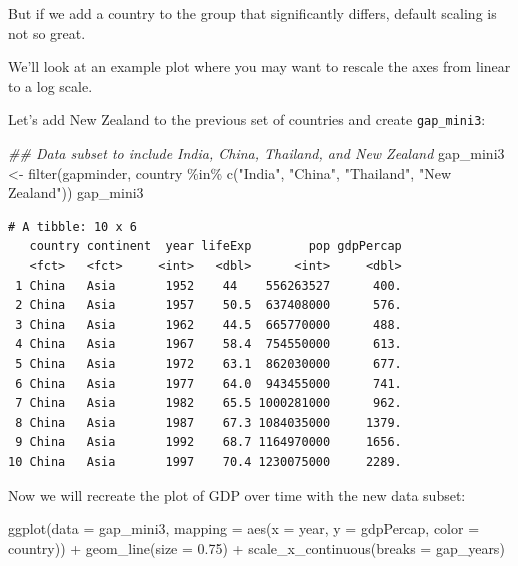 \documentclass[
  letterpaper,
  DIV=11,
  numbers=noendperiod]{scrreprt}
\newenvironment{Shaded}{\begin{snugshade}}{\end{snugshade}}
\newcommand{\AttributeTok}[1]{\textcolor[rgb]{0.40,0.45,0.13}{#1}}
\newcommand{\DocumentationTok}[1]{\textcolor[rgb]{0.37,0.37,0.37}{\textit{#1}}}
\newcommand{\FloatTok}[1]{\textcolor[rgb]{0.68,0.00,0.00}{#1}}
\newcommand{\FunctionTok}[1]{\textcolor[rgb]{0.28,0.35,0.67}{#1}}
\newcommand{\NormalTok}[1]{\textcolor[rgb]{0.00,0.23,0.31}{#1}}
\newcommand{\OtherTok}[1]{\textcolor[rgb]{0.00,0.23,0.31}{#1}}
\newcommand{\SpecialCharTok}[1]{\textcolor[rgb]{0.37,0.37,0.37}{#1}}
\newcommand{\StringTok}[1]{\textcolor[rgb]{0.13,0.47,0.30}{#1}}
\begin{document}
But if we add a country to the group that significantly differs, default
scaling is not so great.

We'll look at an example plot where you may want to rescale the axes
from linear to a log scale.

Let's add New Zealand to the previous set of countries and create
\texttt{gap\_mini3}:

\begin{Shaded}
\begin{Highlighting}[]
\DocumentationTok{\#\# Data subset to include India, China, Thailand, and New Zealand}
\NormalTok{gap\_mini3 }\OtherTok{\textless{}{-}} \FunctionTok{filter}\NormalTok{(gapminder,}
\NormalTok{                    country }\SpecialCharTok{\%in\%} \FunctionTok{c}\NormalTok{(}\StringTok{"India"}\NormalTok{,}
                                   \StringTok{"China"}\NormalTok{,}
                                   \StringTok{"Thailand"}\NormalTok{,}
                                   \StringTok{"New Zealand"}\NormalTok{))}
\NormalTok{gap\_mini3}
\end{Highlighting}
\end{Shaded}

\begin{verbatim}
# A tibble: 10 x 6
   country continent  year lifeExp        pop gdpPercap
   <fct>   <fct>     <int>   <dbl>      <int>     <dbl>
 1 China   Asia       1952    44    556263527      400.
 2 China   Asia       1957    50.5  637408000      576.
 3 China   Asia       1962    44.5  665770000      488.
 4 China   Asia       1967    58.4  754550000      613.
 5 China   Asia       1972    63.1  862030000      677.
 6 China   Asia       1977    64.0  943455000      741.
 7 China   Asia       1982    65.5 1000281000      962.
 8 China   Asia       1987    67.3 1084035000     1379.
 9 China   Asia       1992    68.7 1164970000     1656.
10 China   Asia       1997    70.4 1230075000     2289.
\end{verbatim}

Now we will recreate the plot of GDP over time with the new data subset:

\begin{Shaded}
\begin{Highlighting}[]
\FunctionTok{ggplot}\NormalTok{(}\AttributeTok{data =}\NormalTok{ gap\_mini3, }
       \AttributeTok{mapping =} \FunctionTok{aes}\NormalTok{(}\AttributeTok{x =}\NormalTok{ year, }
                     \AttributeTok{y =}\NormalTok{ gdpPercap, }
                     \AttributeTok{color =}\NormalTok{ country)) }\SpecialCharTok{+}
  \FunctionTok{geom\_line}\NormalTok{(}\AttributeTok{size =} \FloatTok{0.75}\NormalTok{) }\SpecialCharTok{+}
  \FunctionTok{scale\_x\_continuous}\NormalTok{(}\AttributeTok{breaks =}\NormalTok{ gap\_years)}
\end{Highlighting}
\end{Shaded}
\end{document}
